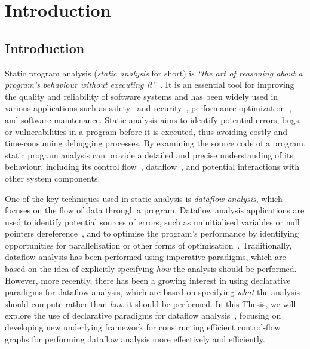 \chapter{Introduction}
\section{Introduction}

Static program analysis (\emph{static analysis} for short) is 
\emph{``the art of reasoning about a program's behaviour without executing it''}~\cite{spa}.
It is an essential tool for improving the quality and reliability of software
systems and has been widely used in various applications such
as safety~\cite{cousot2005astree,Blanchet2002} and security~\cite{piskachev2021secucheck,flowDroid,ayewah2008using,dura2021javadl,fink2012wala},
performance optimization~\cite{aho2007compilers,appel2004modern}, and software maintenance.
Static analysis aims to identify potential errors, bugs, or vulnerabilities
in a program before it is executed, thus avoiding costly and time-consuming 
debugging processes. By examining the source code of a program, static program 
analysis can provide a detailed and precise understanding of its behaviour, including
its control flow~\cite{allen1970control}, dataflow~\cite{kam1977monotone}, and potential interactions with other system components.



One of the key techniques used in static analysis is \emph{dataflow analysis},
which focuses on the flow of data through a program. Dataflow analysis applications are used to identify
potential sources of errors, such as uninitialised variables or null pointers dereference~\cite{riouak2021precise,10.1016/j.scico.2012.02.002}, 
and to optimise the program's performance by identifying opportunities for 
parallelisation or other forms of optimisation~\cite{aho2007compilers}.
Traditionally, dataflow analysis has been performed using imperative paradigms, 
which are based on the idea of explicitly specifying \emph{how} the analysis should be 
performed. 
However, more recently, there has been a growing interest in using 
declarative paradigms for dataflow analysis, which are based on specifying \emph{what}
the analysis should compute rather than \emph{how} it should be performed.
In this Thesis, we will explore the use of declarative paradigms for dataflow 
analysis~\cite{smits2020flowspec,madsen2016programming}, focusing on developing new underlying framework for constructing 
efficient control-flow graphs for performing dataflow 
analysis more effectively and efficiently.

